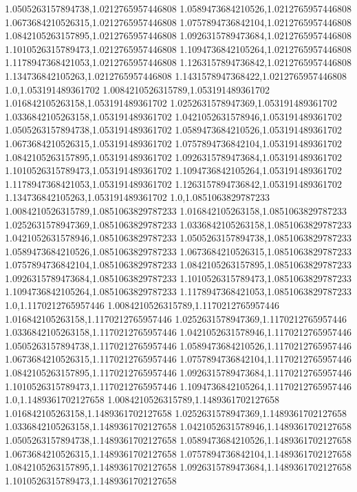 1.0505263157894738,1.0212765957446808
1.0589473684210526,1.0212765957446808
1.0673684210526315,1.0212765957446808
1.0757894736842104,1.0212765957446808
1.0842105263157895,1.0212765957446808
1.0926315789473684,1.0212765957446808
1.1010526315789473,1.0212765957446808
1.1094736842105264,1.0212765957446808
1.1178947368421053,1.0212765957446808
1.1263157894736842,1.0212765957446808
1.134736842105263,1.0212765957446808
1.1431578947368422,1.0212765957446808
1.0,1.053191489361702
1.0084210526315789,1.053191489361702
1.016842105263158,1.053191489361702
1.0252631578947369,1.053191489361702
1.0336842105263158,1.053191489361702
1.0421052631578946,1.053191489361702
1.0505263157894738,1.053191489361702
1.0589473684210526,1.053191489361702
1.0673684210526315,1.053191489361702
1.0757894736842104,1.053191489361702
1.0842105263157895,1.053191489361702
1.0926315789473684,1.053191489361702
1.1010526315789473,1.053191489361702
1.1094736842105264,1.053191489361702
1.1178947368421053,1.053191489361702
1.1263157894736842,1.053191489361702
1.134736842105263,1.053191489361702
1.0,1.0851063829787233
1.0084210526315789,1.0851063829787233
1.016842105263158,1.0851063829787233
1.0252631578947369,1.0851063829787233
1.0336842105263158,1.0851063829787233
1.0421052631578946,1.0851063829787233
1.0505263157894738,1.0851063829787233
1.0589473684210526,1.0851063829787233
1.0673684210526315,1.0851063829787233
1.0757894736842104,1.0851063829787233
1.0842105263157895,1.0851063829787233
1.0926315789473684,1.0851063829787233
1.1010526315789473,1.0851063829787233
1.1094736842105264,1.0851063829787233
1.1178947368421053,1.0851063829787233
1.0,1.1170212765957446
1.0084210526315789,1.1170212765957446
1.016842105263158,1.1170212765957446
1.0252631578947369,1.1170212765957446
1.0336842105263158,1.1170212765957446
1.0421052631578946,1.1170212765957446
1.0505263157894738,1.1170212765957446
1.0589473684210526,1.1170212765957446
1.0673684210526315,1.1170212765957446
1.0757894736842104,1.1170212765957446
1.0842105263157895,1.1170212765957446
1.0926315789473684,1.1170212765957446
1.1010526315789473,1.1170212765957446
1.1094736842105264,1.1170212765957446
1.0,1.1489361702127658
1.0084210526315789,1.1489361702127658
1.016842105263158,1.1489361702127658
1.0252631578947369,1.1489361702127658
1.0336842105263158,1.1489361702127658
1.0421052631578946,1.1489361702127658
1.0505263157894738,1.1489361702127658
1.0589473684210526,1.1489361702127658
1.0673684210526315,1.1489361702127658
1.0757894736842104,1.1489361702127658
1.0842105263157895,1.1489361702127658
1.0926315789473684,1.1489361702127658
1.1010526315789473,1.1489361702127658
